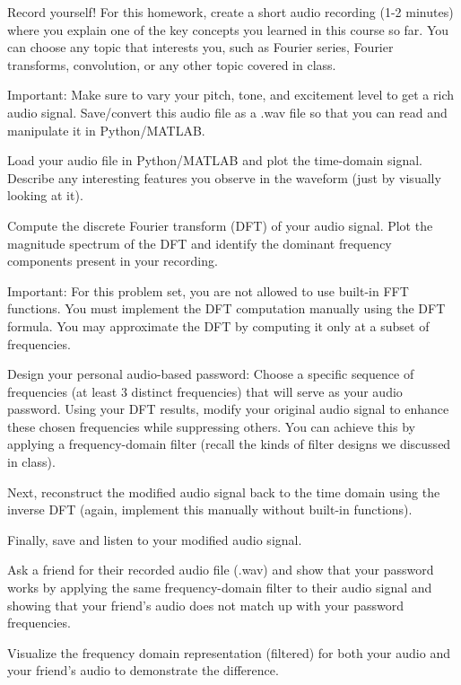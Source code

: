 \documentclass{ee102_pset}
\author{\rule{3cm}{0.4pt}} %
\begin{document}

Record yourself! For this homework, create a short audio recording (1-2 minutes) where you explain one of the key concepts you learned in this course so far. You can choose any topic that interests you, such as Fourier series, Fourier transforms, convolution, or any other topic covered in class. 

Important: Make sure to vary your pitch, tone, and excitement level to get a rich audio signal. Save/convert this audio file as a .wav file so that you can read and manipulate it in Python/MATLAB.

\problempart [10 points]
Load your audio file in Python/MATLAB and plot the time-domain signal. Describe any interesting features you observe in the waveform (just by visually looking at it).

\problempart [40 points]
Compute the discrete Fourier transform (DFT) of your audio signal. Plot the magnitude spectrum of the DFT and identify the dominant frequency components present in your recording. 

Important: For this problem set, you are not allowed to use built-in FFT functions. You must implement the DFT computation manually using the DFT formula. You may approximate the DFT by computing it only at a subset of frequencies.

\problempart [40 points]
Design your personal audio-based password: Choose a specific sequence of frequencies (at least 3 distinct frequencies) that will serve as your audio password. Using your DFT results, modify your original audio signal to enhance these chosen frequencies while suppressing others. You can achieve this by applying a frequency-domain filter (recall the kinds of filter designs we discussed in class).

Next, reconstruct the modified audio signal back to the time domain using the inverse DFT (again, implement this manually without built-in functions). 

Finally, save and listen to your modified audio signal. 

\problempart [20 points] Ask a friend for their recorded audio file (.wav) and show that your password works by applying the same frequency-domain filter to their audio signal and showing that your friend's audio does not match up with your password frequencies.

Visualize the frequency domain representation (filtered) for both your audio and your friend's audio to demonstrate the difference.
\end{document}
